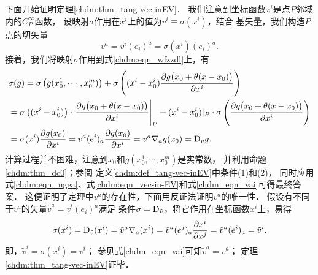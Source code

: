 下面开始证明定理\ref{chdm:thm_tang-vec-inEV}．
我们注意到坐标函数$x^i$是点$P$邻域内的$C^\infty_P$函数，
设映射$\sigma$作用在$x^i$上的值为$v^i\equiv\sigma(x^i)$，结合
基矢量，我们构造$P$点的切矢量
\begin{equation}\label{chdm_eqn_vai}
    v^a = v^i (e_i)^a =\sigma(x^i)(e_i)^a.
\end{equation}
接着，我们将映射$\sigma$作用到式\eqref{chdm:eqn_wfzzdl}上，有
\setlength{\mathindent}{0em}
\begin{align*}
    &\sigma(g) = \sigma\left(g(x^1_0,\cdots,x^m_0)\right)+
    \sigma\left((x^i-x^i_0) \frac{\partial g\bigl(x_0+\theta(x-x_0) \bigr)}{\partial x^i}\right) \\
    &= \sigma\left((x^i-x^i_0) \right) \cdot 
       \left.\frac{\partial g\bigl(x_0+\theta(x-x_0) \bigr)}{\partial x^i}\right|_{P}
    +  (x^i-x^i_0)|_P \cdot \sigma\left(\frac{\partial g\bigl(x_0+\theta(x-x_0) \bigr)}{\partial x^i}\right) \\
    &= \sigma(x^i) \frac{\partial g(x_0)}{\partial x^i}
    =v^a (e^i)_a \frac{\partial g(x_0)}{\partial x^i}
    =v^a \nabla_a g(x_0) = {\rm D}_v g.
\end{align*}\setlength{\mathindent}{2em}
计算过程并不困难，注意到$x_0$和$g(x^1_0,\cdots,x^m_0)$是实常数，
并利用命题\ref{chdm:thm_dc0}；参阅
定义\ref{chdm:def_tang-vec-inEV}中条件(1)和(2)，
同时应用式\eqref{chdm:eqn_ngea}、式\eqref{chdm:eqn_vec-in-EV}和式\eqref{chdm_eqn_vai}可得最终答案．
这便证明了定理中$v^a$的存在性，下面用反证法证明$v^a$的唯一性．
假设有不同于$v^a$的矢量$\tilde{v}^a = \tilde{v}^i (e_i)^a$满足
条件$\sigma={\rm D}_{\tilde{v}}$，将它作用在坐标函数$x^i$上，易得
\begin{equation}
    \sigma(x^i)={\rm D}_{\tilde{v}}(x^i) =\tilde{v}^a \nabla_a (x^i)
    =\tilde{v}^a (e^j)_a \frac{\partial x^i}{\partial x^j}
    =\tilde{v}^a (e^i)_a = \tilde{v}^i .
\end{equation}
即，$\tilde{v}^i = \sigma(x^i) = v^i$；
参见式\eqref{chdm_eqn_vai}可知$\tilde{v}^a = v^a$；
定理\ref{chdm:thm_tang-vec-inEV}证毕．

